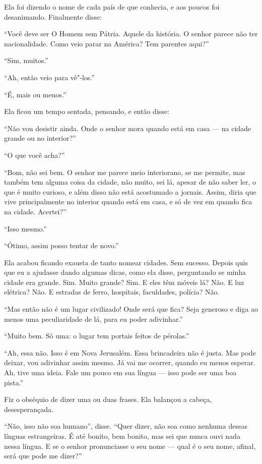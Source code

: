 Ela foi dizendo o nome de cada país de que conhecia, e aos poucos foi
desanimando. Finalmente disse:

“Você deve ser O Homem sem Pátria. Aquele da história. O senhor parece não ter
nacionalidade. Como veio parar na América? Tem parentes aqui?”

“Sim, muitos.”

“Ah, então veio para vê"-los.”

“É, mais ou menos.”

Ela ficou um tempo sentada, pensando, e então disse:

“Não vou desistir ainda. Onde o senhor mora quando está em casa --- na cidade grande ou no
interior?”

“O que você acha?”

``Bom, não sei bem. O senhor me parece meio interiorano, se me permite,
mas também tem alguma coisa da cidade, não muito, sei lá, apesar
de não saber ler, o que é muito curioso, e além disso não está acostumado a
jornais. Assim, diria que vive principalmente no interior quando está em casa, e
só de vez em quando fica na cidade. Acertei?''

“Isso mesmo.”

“Ótimo, assim posso tentar de novo.”

Ela acabou ficando exausta de tanto nomear cidades. Sem sucesso. Depois quis que eu a
ajudasse dando algumas dicas, como ela disse, perguntando se minha cidade era
grande. Sim. Muito grande? Sim. E eles têm móveis lá? Não. E luz elétrica? Não. E
estradas de ferro, hospitais, faculdades, polícia? Não.

“Mas então não é um lugar civilizado! Onde será que fica? Seja generoso e
diga ao menos uma peculiaridade de lá, para eu poder adivinhar.”

“Muito bem. Só uma: o lugar tem portais feitos de pérolas.”

“Ah, essa não. Isso é em Nova Jerusalém. Essa brincadeira não é justa. Mas pode
deixar, vou adivinhar assim mesmo. Já vai me ocorrer, quando eu menos
esperar. Ah, tive uma ideia. Fale um pouco em sua língua --- isso pode ser uma boa
pista.”

Fiz o obséquio de dizer uma ou duas frases. Ela balançou a cabeça,
desesperançada.

“Não, isso não soa humano”, disse. “Quer dizer, não soa como nenhuma dessas
línguas estrangeiras. É até bonito, bem bonito, mas sei que nunca ouvi
nada nessa língua. E se o senhor pronunciasse o seu nome --- qual é o seu nome,
afinal, será que pode me dizer?”


